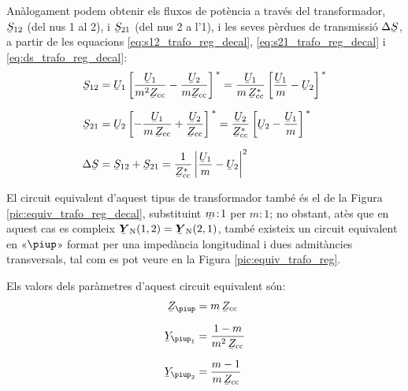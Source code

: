Anàlogament podem obtenir els fluxos de potència a través del
transformador, $\cmplx{S}_{12}$ (del nus 1 al 2), i $\cmplx{S}_{21}$
(del nus 2 a l'1), i les seves pèrdues de transmissió
$\Delta\cmplx{S}$, a partir de les equacions
\eqref{eq:s12_trafo_reg_decal},  \eqref{eq:s21_trafo_reg_decal} i
\eqref{eq:ds_trafo_reg_decal}:  
\begin{align}
   \cmplx{S}_{12} &= \cmplx{U}_1 \left[ \frac{\cmplx{U}_1}{m^2 \cmplx{Z}\ped{cc}} - \frac{\cmplx{U}_2}{m \cmplx{Z}\ped{cc}} \right]^{\,*} = \frac{\cmplx{U}_1}{m \,\cmplx{Z}\ped{cc}^*} \left[ \frac{\cmplx{U}_1}{m} - \cmplx{U}_2 \right]^{\,*}  \\[1.5ex]
   \cmplx{S}_{21} &= \cmplx{U}_2 \left[ - \frac{\cmplx{U}_1}{m \,\cmplx{Z}\ped{cc}} + \frac{\cmplx{U}_2} {\cmplx{Z}\ped{cc}} \right]^{\,*} = \frac{\cmplx{U}_2}{\cmplx{Z}\ped{cc}^*} \left[  \cmplx{U}_2 - \frac{\cmplx{U}_1}{m}  \right]^{\,*} \\[1.5ex]
 \Delta\cmplx{S} &= \cmplx{S}_{12} + \cmplx{S}_{21} = \frac{1}{\cmplx{Z}\ped{cc}^*}  \left|
    \frac{\cmplx{U}_1}{m} - \cmplx{U}_2 \right|^2
\end{align}


El circuit equivalent d'aquest tipus de transformador també és el de la
 Figura \vref{pic:equiv_trafo_reg_decal}, substituint $\cmplx{m}\!:\!1$ per $m\!:\!1$; no
 obstant, atès que en aquest cas es compleix $\mcmplx{Y}\ped{N}(1,2) = \mcmplx{Y}\ped{N}(2,1)$, també
 existeix un circuit equivalent en «$\piup$» format per una impedància longitudinal i dues admitàncies transversals, tal com es pot veure en la Figura  \vref{pic:equiv_trafo_reg}.

\begin{center}
    
    \label{pic:equiv_trafo_reg}
\end{center}

Els valors dels paràmetres d'aquest circuit equivalent són:
\begin{align}
   \cmplx{Z}_\piup &= m \, \cmplx{Z}\ped{cc} \\[1.5ex]
   \cmplx{Y}_{\piup_1} &= \frac{1-m}{m^2 \,\cmplx{Z}\ped{cc}} \\[1.5ex]
   \cmplx{Y}_{\piup_2} &= \frac{m-1}{m\, \cmplx{Z}\ped{cc}}
\end{align}

